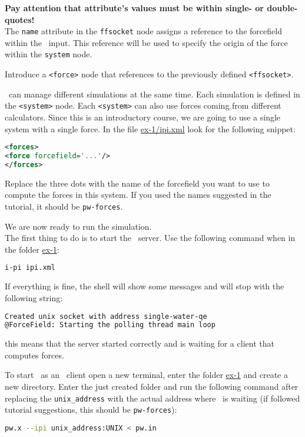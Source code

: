 \documentclass{article}
\begin{document}
\begin{Exercise}[label={i-pi},title={Molecular Dynamics: a client/server approach}]
\textbf{Pay attention that attribute's values must be within single- or
double-quotes!}\\


The \texttt{name} attribute in the \texttt{ffsocket} node assigns a
reference to the forcefield within the \ipi\ input. This reference
will be used to specify the origin of the force within the
\texttt{system} node.

\Question
Introduce a \texttt{<force>} node that references to the previously 
 defined \texttt{<ffsocket>}.

\ipi\ can manage different simulations at the same time. Each
simulation is defined in the \texttt{<system>} node. Each
\texttt{<system>} can also use forces coming from different 
calculators. Since this is an introductory course, we are going to use
a single system with a single force. In the file \url{ex-1/ipi.xml}
look for the following snippet:
\begin{lstlisting}[language=xml]
<forces>
<force forcefield='...'/>
</forces>
\end{lstlisting}
Replace the three dots with the name of the forcefield you want to use
to compute the forces in this system. If you used the names suggested
in the tutorial, it should be \texttt{pw-forces}.

\Question
We are now ready to run the simulation.\\

The first thing to do is to start the \ipi\ server. Use the following
command when in the folder \url{ex-1}:
\begin{lstlisting}[language=bash]
i-pi ipi.xml
\end{lstlisting}
If everything is fine, the shell will show some messages and will stop
with the following string:
\begin{lstlisting}[language=bash]
Created unix socket with address single-water-qe
@ForceField: Starting the polling thread main loop
\end{lstlisting}
this means that the server started correctly and is waiting for a
client that computes forces.

To start \pwx\ as an \ipi\ client open a new terminal, enter the
folder \url{ex-1} and create a new directory. Enter the just
created folder and run the
following command after replacing the \texttt{unix\_address} with the
actual address where \ipi\ is waiting (if followed tutorial
suggestions, this should be \texttt{pw-forces}):
\begin{lstlisting}[language=bash]
pw.x --ipi unix_address:UNIX < pw.in
\end{lstlisting}



\end{Exercise}
\end{document}
